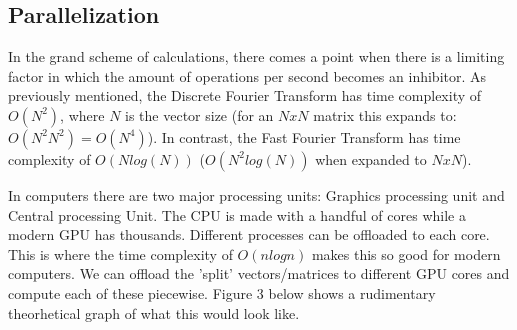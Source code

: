 \documentclass{article}
\begin{document}
\begin{center}
    \section{Parallelization}    
    \end{center}
    
    \begin{sloppypar}
        \indent{} In the grand scheme of calculations, there comes a point when there is a limiting factor in which the amount of operations per second becomes an inhibitor. As previously mentioned, the Discrete Fourier Transform has time complexity of $O(N^2)$, where $N$ is the vector size (for an $NxN$ matrix this expands to: $O(N^2N^2) = O(N^4)$). In contrast, the Fast Fourier Transform has time complexity of $O(Nlog(N))$ ($O(N^2log(N))$ when expanded to $NxN$).
    \end{sloppypar}
    \vspace{2mm}
    \begin{center}
    \end{center}
    \begin{sloppypar}
        \indent{}In computers there are two major processing units: Graphics processing unit and Central processing Unit. The CPU is made with a handful of cores while a modern GPU has thousands. Different processes can be offloaded to each core.
        This is where the time complexity of $O(nlogn)$ makes this so good for modern computers. We can offload the 'split' vectors/matrices to different GPU cores and compute each of these piecewise. Figure 3 below shows a rudimentary theorhetical graph of what this would look like. 
    \end{sloppypar}
\end{document}
